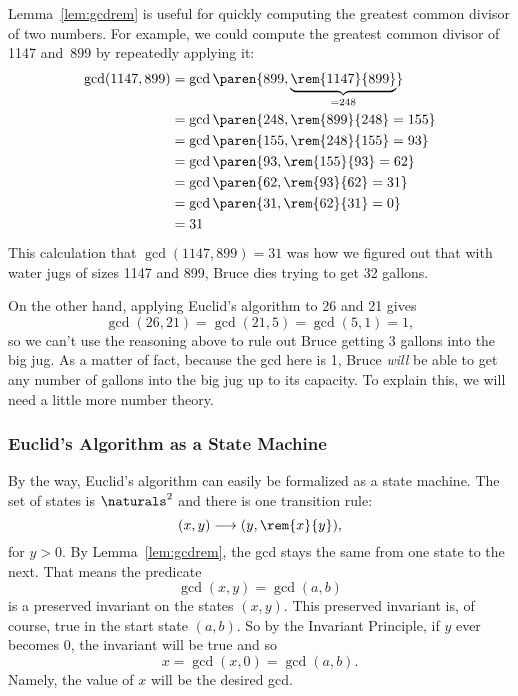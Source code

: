 Lemma~\ref{lem:gcdrem} is useful for quickly computing the greatest
common divisor of two numbers.  For example, we could compute the
greatest common divisor of 1147 and~899 by repeatedly applying it:
\begin{align*}
\gcd(1147, 899) &= \gcd\paren{899, \underbrace{\rem{1147}{899}}_{{} = 248}} \\
&= \gcd\paren{248, \rem{899}{248} = 155} \\
&= \gcd\paren{155, \rem{248}{155} = 93} \\
&= \gcd\paren{ 93, \rem{155}{93} = 62}\\
&= \gcd\paren{ 62, \rem{93}{62} = 31} \\
&= \gcd\paren{ 31, \rem{62}{31} = 0} \\
&= 31
\end{align*}
This calculation that $\gcd(1147, 899) = 31$ was how we figured out
that with water jugs of sizes 1147 and 899, Bruce dies trying to get
32 gallons.

On the other hand, applying Euclid's algorithm to 26 and 21 gives
\[
\gcd(26, 21) = \gcd(21, 5) = \gcd(5, 1) = 1,
\]
so we can't use the reasoning above to rule out Bruce getting 3
gallons into the big jug.  As a matter of fact, because the gcd here
is 1, Bruce \emph{will} be able to get any number of gallons into the big jug
up to its capacity.  To explain this, we will need a little more
number theory.

\subsubsection{Euclid's Algorithm as a State Machine}
By the way, Euclid's algorithm can easily be formalized as a state
machine.  The set of states is $\naturals^2$ and there is one
transition rule:
\begin{equation}\label{euclid_transition}
(x,y) \movesto (y, \rem{x}{y}),
\end{equation}
for $y>0$.  By Lemma~\ref{lem:gcdrem}, the gcd stays the same from one
state to the next.  That means the predicate
\[
\gcd(x,y) = \gcd(a,b)
\]
is a preserved invariant on the states $(x,y)$.  This preserved
invariant is, of course, true in the start state $(a,b)$.  So by the
Invariant Principle, if $y$ ever becomes $0$, the invariant will be
true and so
\[
x = \gcd(x,0) = \gcd(a,b).
\]
Namely, the value of $x$ will be the desired gcd.

